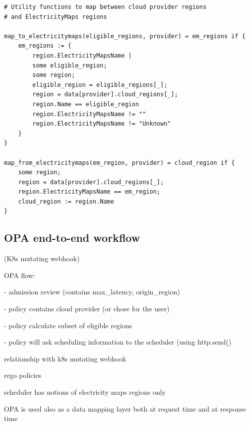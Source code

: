 \begin{lstlisting}[language=Rego, caption=Rego data mapping, label=lst:rego_data_mapping]
# Utility functions to map between cloud provider regions 
# and ElectricityMaps regions

map_to_electricitymaps(eligible_regions, provider) = em_regions if {
    em_regions := {
        region.ElectricityMapsName |                             
        some eligible_region;                       
        some region;                                
        eligible_region = eligible_regions[_];      
        region = data[provider].cloud_regions[_];   
        region.Name == eligible_region             
        region.ElectricityMapsName != ""            
        region.ElectricityMapsName != "Unknown"
    }
}

map_from_electricitymaps(em_region, provider) = cloud_region if {
    some region;                              
    region = data[provider].cloud_regions[_];   
    region.ElectricityMapsName == em_region;    
    cloud_region := region.Name 
}

\end{lstlisting}







\subsection{OPA end-to-end workflow}

 (K8s mutating webhook)

OPA flow:

- admission review (contains max\_latency, origin\_region)

- policy contains cloud provider (or chose for the user)

- policy calculate subset of eligible regions

- policy will ask scheduling information to the scheduler (using http.send()










relationship with k8s mutating webhook

rego policies


scheduler has notions of 
electricity maps regions only

OPA is used also as a data mapping layer
both at request time
and at response time


